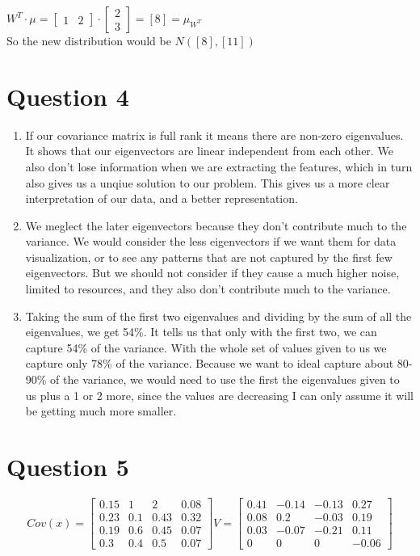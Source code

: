 \documentclass{article}
\begin{document}
$W^T \cdot \mu =
\begin{bmatrix}
    1 & 2
\end{bmatrix}
\cdot
\begin{bmatrix}
    2\\
    3
\end{bmatrix}
= [8]
= \mu_{W^T}
$
\\So the new distribution would be $N([8], [11])$
\section*{Question 4}
\begin{enumerate} [label=(\alph*)]
    \item If our covariance matrix is full rank it means there are non-zero eigenvalues. It shows that our eigenvectors are linear independent from each other.
    We also don't lose information when we are extracting the features, which in turn also gives us a unqiue solution to our problem. This gives us a more clear interpretation of our data, and a better representation.
    \item We meglect the later eigenvectors because they don't contribute much to the variance. We would consider the less eigenvectors if we want them for data visualization, or to see any patterns that are not captured by the first few eigenvectors. 
    But we should not consider if they cause a much higher noise, limited to resources, and they also don't contribute much to the variance.
    \item Taking the sum of the first two eigenvalues and dividing by the sum of all the eigenvalues, we get 54\%. It tells us that only with the first two, we can capture 54\% of the variance.
    With the whole set of values given to us we capture only 78\% of the variance. Because we want to ideal capture about 80-90\% of the variance, we would need to use the first the eigenvalues given to us plus a 1 or 2 more, since the values are decreasing I can only assume it will be getting much more smaller.
\end{enumerate}
\section*{Question 5}
\[
    Cov(x) = 
    \begin{bmatrix}
        0.15 & 1 & 2 & 0.08\\
        0.23 & 0.1 & 0.43 & 0.32\\
        0.19 & 0.6  & 0.45 & 0.07\\
        0.3 & 0.4 & 0.5 & 0.07 
    \end{bmatrix}
    V = 
    \begin{bmatrix}
        0.41 & -0.14 & -0.13 & 0.27\\
        0.08 & 0.2 & -0.03 & 0.19 \\
        0.03 & -0.07 & -0.21 & 0.11\\
        0 & 0 & 0 & -0.06
    \end{bmatrix}
    \]
\end{document}
